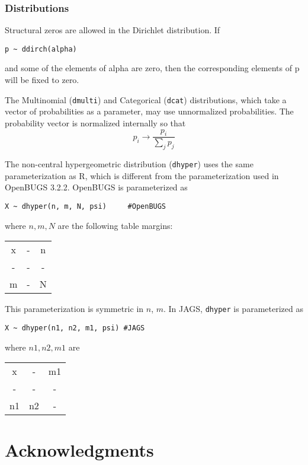 \documentclass[11pt, a4paper, titlepage]{report}
\begin{document}
\subsection{Distributions}

Structural zeros are allowed in the Dirichlet distribution. If
\begin{verbatim}
p ~ ddirch(alpha)
\end{verbatim}
and some of the elements of alpha are zero, then the corresponding
elements of p will be fixed to zero.

The Multinomial (\verb+dmulti+) and Categorical (\verb+dcat+)
distributions, which take a vector of probabilities as a parameter,
may use unnormalized probabilities. The probability vector is
normalized internally so that
\[
p_i \rightarrow \frac{p_i}{\sum_j p_j}
\]

The non-central hypergeometric distribution (\verb+dhyper+) uses the
same parameterization as R, which is different from the
parameterization used in OpenBUGS 3.2.2. OpenBUGS is parameterized as
\begin{verbatim}
X ~ dhyper(n, m, N, psi)     #OpenBUGS
\end{verbatim}
where $n, m, N$ are the following table margins:
\begin{center}
\begin{tabular}{|cc|c|}
\hline
x & - & n \\
-  & - & -  \\
\hline
m & - & N \\
\hline
\end{tabular}
\end{center}
This parameterization is symmetric in $n$, $m$. In JAGS, \verb+dhyper+
is parameterized as
\begin{verbatim}
X ~ dhyper(n1, n2, m1, psi) #JAGS 
\end{verbatim}
where $n1, n2, m1$ are
\begin{center}
\begin{tabular}{|cc|c|}
\hline
x & - & m1 \\
-  & - & -   \\
\hline
n1 & n2 & - \\
\hline
\end{tabular}
\end{center}


\chapter{Acknowledgments}
\end{document}
